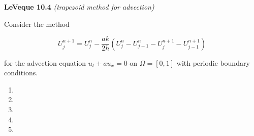 \textbf{LeVeque 10.4}  \textit{(trapezoid method for advection)}

Consider the method

$$
U_j^{n+1} = U_{j}^{n} - \frac{ak}{2h} \left( U_j^n  - U_{j-1}^n - U_{j}^{n+1} - U_{j-1}^{n+1} \right)
$$

for the advection equation $u_t + a u_x = 0$ on $\Omega = [0, 1]$ with periodic boundary conditions.

\begin{enumerate}
  \item 
  \pagebreak
  \item 
  \pagebreak
  \item 
  \pagebreak
  \item 
  \pagebreak
  \item 
\end{enumerate} 